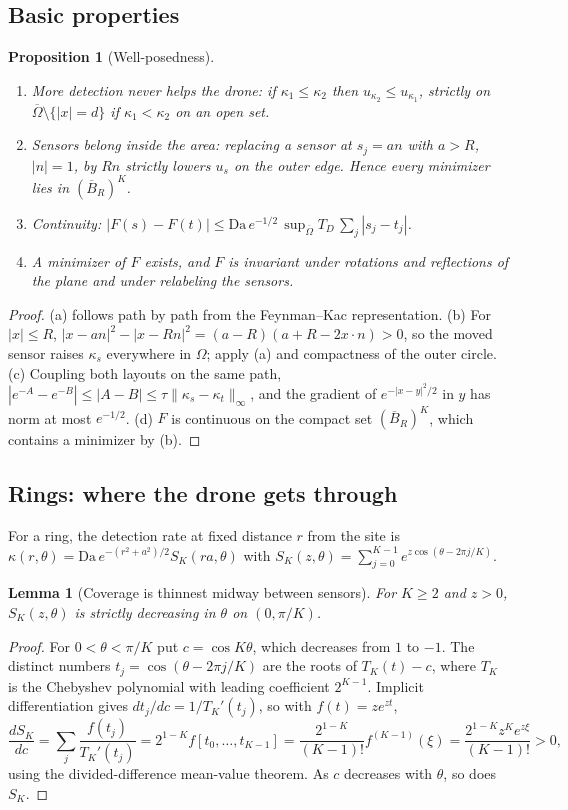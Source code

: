 \documentclass[11pt]{article}
\newtheorem{proposition}[theorem]{Proposition}
\newtheorem{lemma}[theorem]{Lemma}
\theoremstyle{remark}
\newcommand{\Da}{\mathrm{Da}}
\begin{document}
\subsection{Basic properties}
\begin{proposition}[Well-posedness]\label{prop:basic}
\begin{enumerate}[label=(\alph*)]
\item \emph{More detection never helps the drone:} if $\kappa_1\le\kappa_2$ then
$u_{\kappa_2}\le u_{\kappa_1}$, strictly on $\overline\Omega\setminus\{|x|=d\}$ if
$\kappa_1<\kappa_2$ on an open set.
\item \emph{Sensors belong inside the area:} replacing a sensor at $s_j=a n$ with $a>R$,
$|n|=1$, by $Rn$ strictly lowers $u_s$ on the outer edge. Hence every minimizer lies in
$(\overline B_R)^K$.
\item \emph{Continuity:} $|F(s)-F(t)|\le \Da\,e^{-1/2}\,\sup_{\overline\Omega}T_D\,
\sum_j|s_j-t_j|$.
\item A minimizer of $F$ exists, and $F$ is invariant under rotations and reflections of the
plane and under relabeling the sensors.
\end{enumerate}
\end{proposition}
\begin{proof}
(a) follows path by path from the Feynman--Kac representation. (b) For $|x|\le R$,
$|x-an|^2-|x-Rn|^2=(a-R)(a+R-2x\cdot n)>0$, so the moved sensor raises $\kappa_s$ everywhere in
$\Omega$; apply (a) and compactness of the outer circle. (c) Coupling both layouts on the
same path, $|e^{-A}-e^{-B}|\le|A-B|\le\tau\|\kappa_s-\kappa_t\|_\infty$, and the gradient of
$e^{-|x-y|^2/2}$ in $y$ has norm at most $e^{-1/2}$. (d) $F$ is continuous on the compact set
$(\overline B_R)^K$, which contains a minimizer by (b).
\end{proof}

\subsection{Rings: where the drone gets through}
For a ring, the detection rate at fixed distance $r$ from the site is
$\kappa(r,\theta)=\Da\,e^{-(r^2+a^2)/2}S_K(ra,\theta)$ with
$S_K(z,\theta)=\sum_{j=0}^{K-1}e^{z\cos(\theta-2\pi j/K)}$.
\begin{lemma}[Coverage is thinnest midway between sensors]\label{lem:midpoint}
For $K\ge2$ and $z>0$, $S_K(z,\theta)$ is strictly decreasing in $\theta$ on $(0,\pi/K)$.
\end{lemma}
\begin{proof}
For $0<\theta<\pi/K$ put $c=\cos K\theta$, which decreases from $1$ to $-1$. The distinct
numbers $t_j=\cos(\theta-2\pi j/K)$ are the roots of $T_K(t)-c$, where $T_K$ is the Chebyshev
polynomial with leading coefficient $2^{K-1}$. Implicit differentiation gives
$dt_j/dc=1/T_K'(t_j)$, so with $f(t)=z e^{zt}$,
\[
\frac{dS_K}{dc}=\sum_j\frac{f(t_j)}{T_K'(t_j)}=2^{1-K}f[t_0,\dots,t_{K-1}]
=\frac{2^{1-K}}{(K-1)!}f^{(K-1)}(\xi)=\frac{2^{1-K}z^K e^{z\xi}}{(K-1)!}>0,
\]
using the divided-difference mean-value theorem. As $c$ decreases with $\theta$, so does $S_K$.
\end{proof}
\end{document}

